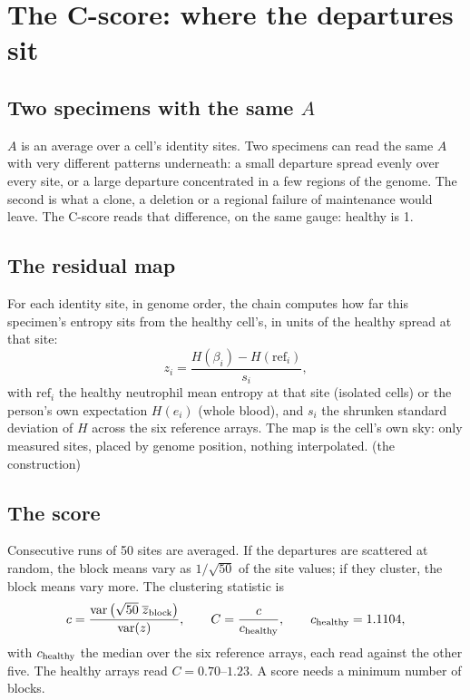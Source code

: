 \chapter{The C-score: where the departures sit}\label{ch:cscore}

\section{Two specimens with the same $A$}

$A$ is an average over a cell's identity sites. Two specimens can read the same $A$ with very different patterns underneath:
a small departure spread evenly over every site, or a large departure concentrated in a few regions of the genome. The second
is what a clone, a deletion or a regional failure of maintenance would leave. The C-score reads that difference, on the same
gauge: healthy is 1.

\section{The residual map}

For each identity site, in genome order, the chain computes how far this specimen's entropy sits from the healthy cell's,
in units of the healthy spread at that site:
\begin{equation}
  z_i=\frac{H(\beta_i)-H(\mathrm{ref}_i)}{s_i},
  \label{eq:z}
\end{equation}
with $\mathrm{ref}_i$ the healthy neutrophil mean entropy at that site (isolated cells) or the person's own expectation
$H(e_i)$ (whole blood), and $s_i$ the shrunken standard deviation of $H$ across the six reference arrays. The map is the cell's
own sky: only measured sites, placed by genome position, nothing interpolated. \derived{} (the construction)

\section{The score}

Consecutive runs of 50 sites are averaged. If the departures are scattered at random, the block means vary as $1/\sqrt{50}$
of the site values; if they cluster, the block means vary more. The clustering statistic is
\begin{equation}
  c=\frac{\mathrm{var}\left(\sqrt{50}\;\overline{z}_{\rm block}\right)}{\mathrm{var}(z)},\qquad
  C=\frac{c}{c_{\rm healthy}},\qquad c_{\rm healthy}=1.1104,
  \label{eq:C}
\end{equation}
with $c_{\rm healthy}$ the median over the six reference arrays, each read against the other five. \calibrated{} The healthy arrays read $C=0.70$--$1.23$. A score needs a minimum
number of blocks.

